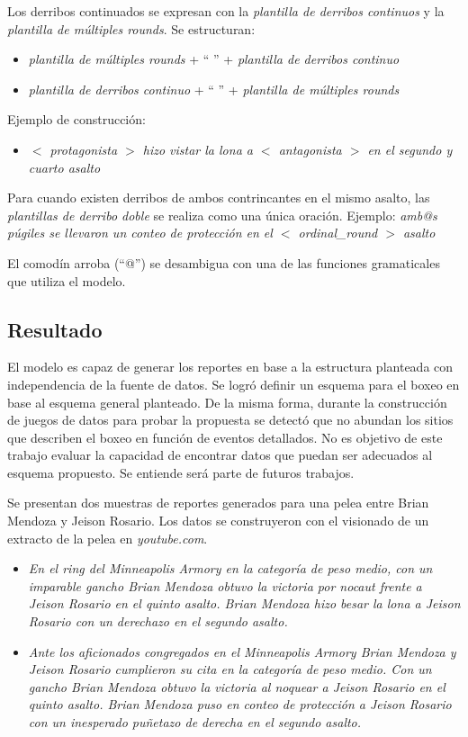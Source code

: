     Los derribos continuados se expresan con la \textit{plantilla de derribos continuos}  y la \textit{plantilla de múltiples rounds}.
    Se estructuran:
    \begin{itemize}
        \item \textit{plantilla de múltiples rounds} + “ ” + \textit{plantilla de derribos continuo}
        \item \textit{plantilla de derribos continuo} + “ ” + \textit{plantilla de múltiples rounds} 
    \end{itemize}
    Ejemplo de construcción:
    \begin{itemize}
        \item \textit{ $<$ protagonista $>$ hizo vistar la lona a $<$ antagonista $>$ en el segundo y cuarto asalto}
    \end{itemize}

    Para cuando existen derribos de ambos contrincantes en el mismo asalto, las \textit{plantillas de derribo doble} se realiza como 
una única oración.
    Ejemplo: \textit{amb@s púgiles se llevaron un conteo de protección en el $<$ ordinal\_round $>$ asalto}

    El comodín arroba (“@”) se desambigua con una de las funciones gramaticales que utiliza el modelo. 

\subsection{Resultado}

    El modelo es capaz de generar los reportes en base a la estructura planteada con independencia de la fuente de datos. 
Se logró definir un esquema para el boxeo en base al esquema general planteado. De la misma forma, durante la construcción de juegos 
de datos para probar la propuesta se detectó que no abundan los sitios que describen el boxeo en función de eventos detallados. No es 
objetivo de este trabajo evaluar la capacidad de encontrar datos que puedan ser adecuados al esquema propuesto. Se entiende será parte de 
futuros trabajos.

    Se presentan dos muestras de reportes generados para una pelea entre Brian Mendoza y Jeison Rosario. Los datos se construyeron con el 
visionado de un extracto de la pelea en \textit{youtube.com}.

    \begin{itemize}
        \item \textit{En el ring del Minneapolis Armory en la categoría de peso medio, con un imparable gancho Brian Mendoza obtuvo la victoria por nocaut frente 
        a Jeison Rosario en el quinto asalto.
        Brian Mendoza hizo besar la lona a Jeison Rosario con un derechazo en el segundo asalto.}
        \item \textit{Ante los aficionados congregados en el Minneapolis Armory Brian Mendoza y Jeison Rosario cumplieron su cita en la categoría 
        de peso medio. Con un gancho Brian Mendoza obtuvo la victoria al noquear a Jeison Rosario en el quinto asalto.
        Brian Mendoza puso en conteo de protección a Jeison Rosario con un inesperado puñetazo de derecha en el segundo asalto.}
    \end{itemize}